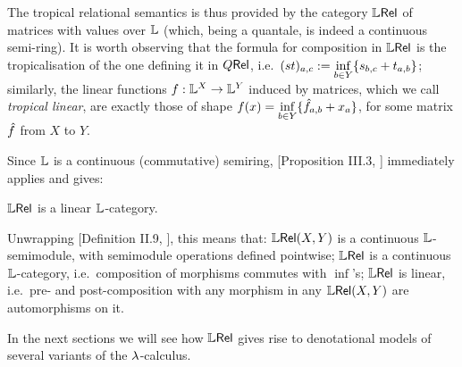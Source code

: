 The tropical relational semantics is thus provided by the category $\mathbb{L} \mathsf{Rel}$ of matrices with values over $\mathbb{L}$ (which, being a quantale, is indeed a continuous semi-ring).
It is worth observing that the formula for composition in $\mathbb{L} \mathsf{Rel}$ is the tropicalisation of the one defining it in $Q \mathsf{Rel}$, i.e.\ $(st)_{a,c}:=\inf\limits_{b\in Y}\{s_{b,c}+t_{a,b}\}$;
 similarly, the linear functions $f:\mathbb{L}^X\to \mathbb{L}^Y$ induced by matrices, which we call \emph{tropical linear}, are exactly those of shape $f(x)=\inf\limits_{b\in Y} \{\hat{f}_{a,b}+x_a\}$, for some matrix $\hat{f}$ from $X$ to $Y$.

Since $\mathbb{L}$ is a continuous (commutative) semiring, [Proposition III.3, \cite{Manzo2013}] immediately applies and gives:

\begin{fact}
 $\mathbb{L} \mathsf{Rel}$ is a linear $\mathbb{L}$-category.
\end{fact}

Unwrapping [Definition II.9, \cite{Manzo2013}], this means that:
${\mathbb{L} \mathsf{Rel}}(X,Y)$ is a continuous $\mathbb{L}$-semimodule, with semimodule operations defined pointwise;
$\mathbb{L} \mathsf{Rel}$ is a continuous $\mathbb{L}$-category, i.e.\ composition of morphisms commutes with $\inf$'s;
$\mathbb{L} \mathsf{Rel}$ is linear, i.e.\ pre- and post-composition with any morphism in any ${\mathbb{L} \mathsf{Rel}}(X,Y)$ are automorphisms on it.

In the next sections we will see how $\mathbb{L} \mathsf{Rel}$ gives rise to denotational models of several variants of the $\lambda$-calculus.
